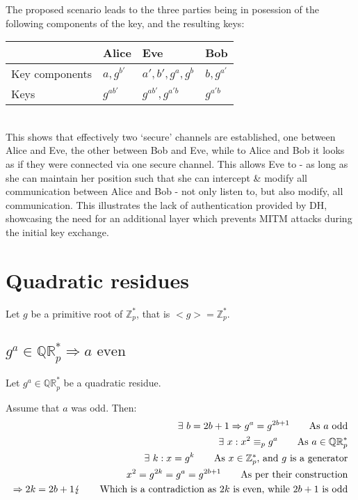 \documentclass[a4paper]{scrreprt}
\begin{document}
The proposed scenario leads to the three parties being in posession of the
following components of the key, and the resulting keys:
\\

\begin{tabular}{llll}
	\toprule
	& Alice & Eve & Bob \\
	\midrule
	Key components & $a, g^{b'}$ & $a', b', g^a, g^b$ & $b, g^{a'}$ \\
	Keys & $g^{ab'}$ & $g^{ab'}, g^{a'b}$ & $g^{a'b}$ \\
	\bottomrule
\end{tabular}
\\

This shows that effectively two `secure' channels are established, one between
Alice and Eve, the other between Bob and Eve, while to Alice and Bob it looks
as if they were connected via one secure channel. This allows Eve to - as long
as she can maintain her position such that she can intercept \& modify all
communication between Alice and Bob - not only listen to, but also modify, all
communication. This illustrates the lack of authentication provided by DH,
showcasing the need for an additional layer which prevents MITM attacks during
the initial key exchange.

\section{Quadratic residues}

Let $g$ be a primitive root of $\mathbb{Z}^*_p$, that is $<g> =
\mathbb{Z}^*_p$.

\subsection{$g^a \in \mathbb{QR}^*_p \Rightarrow a \text{ even}$}

Let $g^a \in \mathbb{QR}^*_p$ be a quadratic residue.

Assume that $a$ was odd. Then:
\begin{align*}
	\exists\ b = 2b + 1 \Rightarrow g^a = g^{2b + 1} \tag*{As $a$ odd} \\
	\exists\ x : x^2 \equiv_p g^a \tag*{As $a \in \mathbb{QR}^*_p$} \\
	\exists\ k : x = g^k \tag*{As $x \in \mathbb{Z}^*_p$, and $g$ is a generator} \\
	x^2 = g^{2k} = g^a = g^{2b + 1} \tag*{As per their construction} \\
	\Rightarrow 2k = 2b + 1 \lightning \tag*{Which is a contradiction as $2k$ is even, while $2b + 1$ is odd}
\end{align*}
\end{document}
